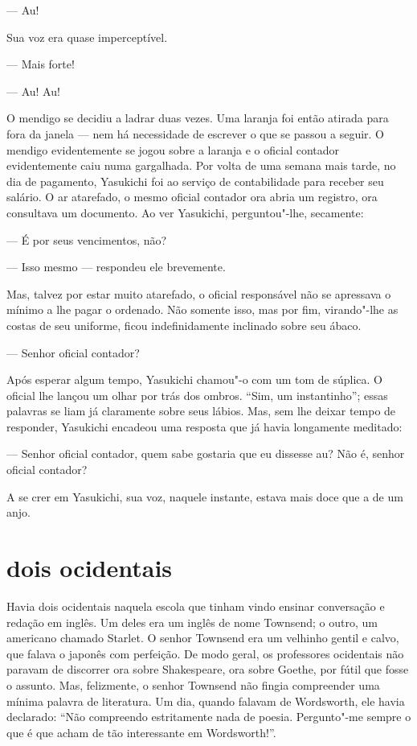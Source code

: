 --- Au!

Sua voz era quase imperceptível.

--- Mais forte!

--- Au! Au!

O mendigo se decidiu a ladrar duas vezes. Uma laranja foi então atirada
para fora da janela --- nem há necessidade de escrever o que se passou a
seguir. O mendigo evidentemente se jogou sobre a laranja e o oficial
contador evidentemente caiu numa gargalhada. Por volta de uma semana
mais tarde, no dia de pagamento, Yasukichi foi ao serviço de
contabilidade para receber seu salário. O ar atarefado, o mesmo oficial
contador ora abria um registro, ora consultava um documento. Ao ver
Yasukichi, perguntou"-lhe, secamente:

--- É por seus vencimentos, não?

--- Isso mesmo --- respondeu ele brevemente.

Mas, talvez por estar muito atarefado, o oficial responsável não se
apressava o mínimo a lhe pagar o ordenado. Não somente isso, mas por
fim, virando"-lhe as costas de seu uniforme, ficou indefinidamente
inclinado sobre seu ábaco.

--- Senhor oficial contador?

Após esperar algum tempo, Yasukichi chamou"-o com um tom de súplica. O
oficial lhe lançou um olhar por trás dos ombros. ``Sim, um instantinho'';
essas palavras se liam já claramente sobre seus lábios. Mas, sem lhe
deixar tempo de responder, Yasukichi encadeou uma resposta que já havia
longamente meditado:

--- Senhor oficial contador, quem sabe gostaria que eu dissesse au? Não é,
senhor oficial contador?

A se crer em Yasukichi, sua voz, naquele instante, estava mais doce que
a de um anjo.

\section*{dois ocidentais}

Havia dois ocidentais naquela escola que tinham vindo ensinar
conversação e redação em inglês. Um deles era um inglês de nome
Townsend; o outro, um americano chamado Starlet. O senhor Townsend era
um velhinho gentil e calvo, que falava o japonês com perfeição. De modo
geral, os professores ocidentais não paravam de discorrer ora sobre
Shakespeare, ora sobre Goethe, por fútil que fosse o assunto. Mas,
felizmente, o senhor Townsend não fingia compreender uma mínima palavra
de literatura. Um dia, quando falavam de Wordsworth, ele havia
declarado: ``Não compreendo estritamente nada de poesia. Pergunto"-me
sempre o que é que acham de tão interessante em Wordsworth!''.

